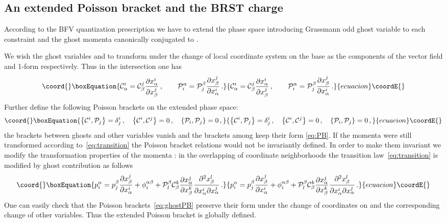 \documentclass[a4paper,11pt,oneside]{amsart}
\theoremstyle{plain}
\numberwithin{equation}{section} %
\numberwithin{figure}{section} %
\providecommand{\pb}[2]{\left\{{}#1{},{}#2{}\right\}}
\def\d{\partial}
\providecommand{\ddl}[2]{\displaystyle\frac{{\d #1}}{\d #2}}
\def\cP{{\mathcal P}}
\def\cc{{\mathcal C}}
\def\cT{{\rm T}}
\def\manM{{\mathcal M}}
\begin{document}
\subsection{An extended Poisson bracket and the BRST charge}
According to the BFV quantization prescription we
have to extend the phase space introducing
Grassmann odd ghost variable \myHighlight{$\cc^i$}\coordHE{} to each constraint
\myHighlight{$\cT_i$}\coordHE{} and the ghost momenta \myHighlight{$\cP_i$}\coordHE{} canonically conjugated
to \myHighlight{$\cc^i$}\coordHE{}.

\noindent
We wish the ghost variables \myHighlight{$\cc^i$}\coordHE{} and \myHighlight{$\cP_i$}\coordHE{} to transform under the
change of local coordinate system on the base \myHighlight{$\manM$}\coordHE{} as the components
of the vector field and 1-form respectively. Thus in the intersection
\coordHE{} one has
\begin{equation}\coord{}\boxEquation{
\cc^i_{\alpha}=\cc^j_\beta \ddl{x^i_\alpha}{x^j_\beta}\,, \qquad
\cP^\alpha_i=\cP^\beta_j \ddl{x^j_\beta}{x^i_\alpha}\,.
}{
\cc^i_{\alpha}=\cc^j_\beta \ddl{x^i_\alpha}{x^j_\beta}\,, \qquad
\cP^\alpha_i=\cP^\beta_j \ddl{x^j_\beta}{x^i_\alpha}\,.
}{ecuacion}\coordE{}\end{equation}
Further define the following Poisson brackets on the extended
phase space:
\begin{equation}\coord{}\boxEquation{
\label{eq:ghostPB}
\pb{\cc^i}{\cP_j}=\delta^i_j\,, \quad \pb{\cc^i}{\cc^j}=0 \,, \quad
\pb{\cP_i}{\cP_j}=0 \,,
}{
\pb{\cc^i}{\cP_j}=\delta^i_j\,, \quad \pb{\cc^i}{\cc^j}=0 \,, \quad
\pb{\cP_i}{\cP_j}=0 \,,
}{ecuacion}\coordE{}\end{equation}
the brackets between ghosts and other variables
vanish and the brackets among \coordHE{} keep
their form \eqref{eq:PB}.  If the momenta \coordHE{} were still
transformed according to~\eqref{eq:transition}
the Poisson bracket relations would not be
invariantly defined.  In order to make them
invariant we modify the transformation properties
of the momenta \coordHE{}: in the overlapping
\coordHE{} of coordinate neighborhoods
the transition law~\eqref{eq:transition} is modified
by ghost contribution as follows
\begin{equation}\coord{}\boxEquation{
        \label{eq:p-transform}
p^\alpha_i=p^\beta_j \frac{\d x^j_\beta}{\d x^i_\alpha}
        +\phi^{\alpha \beta}_i
+\cP^\beta_l \cc_\beta^k
\frac{\d x^j_\alpha}{\d x^k_\beta}
        \frac{\d^2{x^l_\beta}}{\d x_\alpha^i \d x_\alpha^j}\,.
}{
        p^\alpha_i=p^\beta_j \frac{\d x^j_\beta}{\d x^i_\alpha}
        +\phi^{\alpha \beta}_i
+\cP^\beta_l \cc_\beta^k
\frac{\d x^j_\alpha}{\d x^k_\beta}
        \frac{\d^2{x^l_\beta}}{\d x_\alpha^i \d x_\alpha^j}\,.
}{ecuacion}\coordE{}\end{equation}
One can easily check that the Poisson brackets~\eqref{eq:ghostPB}
preserve their form under the change of coordinates on \myHighlight{$\manM$}\coordHE{}
and the corresponding change of other variables.  Thus the
extended Poisson bracket is globally defined.
\end{document}
